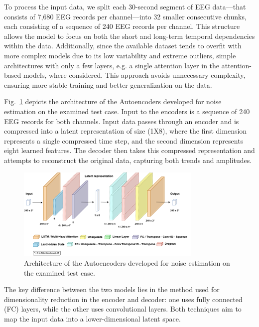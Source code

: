 \documentclass[conference]{IEEEtran}
\begin{document}
To process the input data, we split each 30-second segment of EEG
data---that consists of 7,680 EEG records per channel---into 32
smaller consecutive chunks, each consisting of a sequence of 240 EEG
records per channel. This structure allows the model to focus on both
the short and long-term temporal dependencies within the
data. Additionally, since the available dataset tends to overfit with
more complex models due to its low variability and extreme outliers,
simple architectures with only a few layers, e.g. a single attention
layer in the attention-based models, where considered. This approach
avoids unnecessary complexity, ensuring more stable training and
better generalization on the data.

Fig.~\ref{fig:Fig2} depicts the architecture of the Autoencoders developed for noise estimation on the examined test case. Input to the encoders is a sequence of 240 EEG records for both channels. Input data passes through an encoder and is compressed into a latent representation of size (1X8), where the first dimension represents a single compressed time step, and the second dimension represents eight learned features. The decoder then takes this compressed representation and attempts to reconstruct the original data, capturing both trends and amplitudes. 


\begin{figure}
    \centering
    \includegraphics[width=0.95\columnwidth]{images/Fig2.png}     
    \vspace{-0.1in}
    \caption{\label{fig:Fig2} Architecture of the Autoencoders developed for noise estimation on the examined test case.}
\end{figure}

The key difference between the two models lies in the method used for dimensionality reduction in the encoder and decoder: one uses fully connected (FC) layers, while the other uses convolutional layers. Both techniques aim to map the input data into a lower-dimensional latent space.
\end{document}
